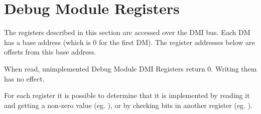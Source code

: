 \section{Debug Module Registers} \label{dmdebbus}

The registers described in this section are accessed over the DMI bus.  Each DM
has a base address (which is 0 for the first DM). The register addresses below
are offsets from this base address.

When read, unimplemented Debug Module DMI Registers return 0. Writing them has
no effect.

For each register it is possible to determine that it is implemented by reading
it and getting a non-zero value (eg. \Rsbcs), or by checking bits in another
register (eg. \Fprogbufsize).


